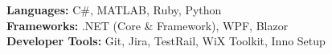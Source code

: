 \textbf{Languages:} C\#, MATLAB, Ruby, Python\\
\textbf{Frameworks:} .NET (Core \& Framework), WPF, Blazor \\
\textbf{Developer Tools:} Git, Jira, TestRail, WiX Toolkit, Inno Setup 